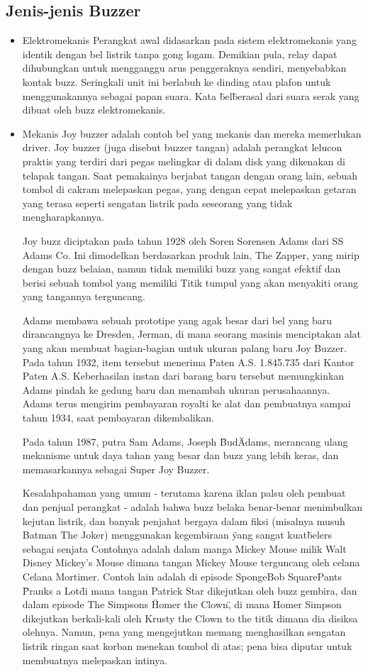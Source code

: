 \subsection{Jenis-jenis Buzzer}
\begin{itemize}
\item Elektromekanis
Perangkat awal didasarkan pada sistem elektromekanis yang identik dengan bel listrik tanpa gong logam. Demikian pula, relay dapat dihubungkan untuk mengganggu 
arus penggeraknya sendiri, menyebabkan kontak buzz. Seringkali unit ini berlabuh ke dinding atau plafon untuk menggunakannya sebagai papan suara. Kata \"bel\" 
berasal dari suara serak yang dibuat oleh buzz elektromekanis.
\item Mekanis
Joy buzzer adalah contoh bel yang mekanis dan mereka memerlukan driver. Joy buzzer (juga disebut buzzer tangan) adalah perangkat lelucon praktis yang terdiri 
dari pegas melingkar di dalam disk yang dikenakan di telapak tangan. Saat pemakainya berjabat tangan dengan orang lain, sebuah tombol di cakram melepaskan 
pegas, yang dengan cepat melepaskan getaran yang terasa seperti sengatan listrik pada seseorang yang tidak mengharapkannya.

Joy buzz diciptakan pada tahun 1928 oleh Soren Sorensen Adams dari SS Adams Co. Ini dimodelkan berdasarkan produk lain, The Zapper, yang mirip dengan buzz 
belaian, namun tidak memiliki buzz yang sangat efektif dan berisi sebuah tombol yang memiliki Titik tumpul yang akan menyakiti orang yang tangannya terguncang.

Adams membawa sebuah prototipe yang agak besar dari bel yang baru dirancangnya ke Dresden, Jerman, di mana seorang masinis menciptakan alat yang akan membuat 
bagian-bagian untuk ukuran palang baru Joy Buzzer. Pada tahun 1932, item tersebut menerima Paten A.S. 1.845.735 dari Kantor Paten A.S. Keberhasilan instan dari 
barang baru tersebut memungkinkan Adams pindah ke gedung baru dan menambah ukuran perusahaannya. Adams terus mengirim pembayaran royalti ke alat dan pembuatnya 
sampai tahun 1934, saat pembayaran dikembalikan.

Pada tahun 1987, putra Sam Adams, Joseph \"Bud\" Adams, merancang ulang mekanisme untuk daya tahan yang besar dan buzz yang lebih keras, dan memasarkannya sebagai
Super Joy Buzzer.

Kesalahpahaman yang umum - terutama karena iklan palsu oleh pembuat dan penjual perangkat - adalah bahwa buzz belaka benar-benar menimbulkan kejutan listrik, 
dan banyak penjahat bergaya dalam fiksi (misalnya musuh Batman The Joker) menggunakan kegembiraan \"yang sangat kuat\" belers sebagai senjata Contohnya adalah 
dalam manga Mickey Mouse milik Walt Disney Mickey's Mouse dimana tangan Mickey Mouse terguncang oleh celana Celana Mortimer. Contoh lain adalah di episode 
SpongeBob SquarePants \"Pranks a Lot\" di mana tangan Patrick Star dikejutkan oleh buzz gembira, dan dalam episode The Simpsons \"Homer the Clown\", di mana Homer 
Simpson dikejutkan berkali-kali oleh Krusty the Clown to the titik dimana dia disiksa olehnya. Namun, pena yang mengejutkan memang menghasilkan sengatan listrik
ringan saat korban menekan tombol di atas; pena bisa diputar untuk membuatnya melepaskan intinya.


\end{itemize}
